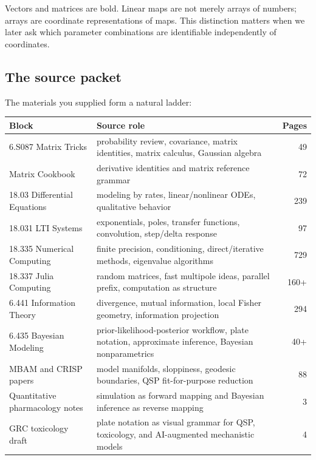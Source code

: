 \documentclass[a4paper]{article}
\begin{document}
\begin{notation}
  Vectors and matrices are bold.  Linear maps are not merely arrays of numbers; arrays are coordinate representations of maps.  This distinction matters when we later ask which parameter combinations are identifiable independently of coordinates.
\end{notation}

\subsection{The source packet}

The materials you supplied form a natural ladder:

\begin{center}
\begin{tabularx}{0.96\textwidth}{@{}lXr@{}}
\toprule
Block & Source role & Pages \\
\midrule
6.S087 Matrix Tricks & probability review, covariance, matrix identities, matrix calculus, Gaussian algebra & 49 \\
Matrix Cookbook & derivative identities and matrix reference grammar & 72 \\
18.03 Differential Equations & modeling by rates, linear/nonlinear ODEs, qualitative behavior & 239 \\
18.031 LTI Systems & exponentials, poles, transfer functions, convolution, step/delta response & 97 \\
18.335 Numerical Computing & finite precision, conditioning, direct/iterative methods, eigenvalue algorithms & 729 \\
18.337 Julia Computing & random matrices, fast multipole ideas, parallel prefix, computation as structure & 160+ \\
6.441 Information Theory & divergence, mutual information, local Fisher geometry, information projection & 294 \\
6.435 Bayesian Modeling & prior-likelihood-posterior workflow, plate notation, approximate inference, Bayesian nonparametrics & 40+ \\
MBAM and CRISP papers & model manifolds, sloppiness, geodesic boundaries, QSP fit-for-purpose reduction & 88 \\
Quantitative pharmacology notes & simulation as forward mapping and Bayesian inference as reverse mapping & 3 \\
GRC toxicology draft & plate notation as visual grammar for QSP, toxicology, and AI-augmented mechanistic models & 4 \\
\bottomrule
\end{tabularx}
\end{center}
\end{document}
